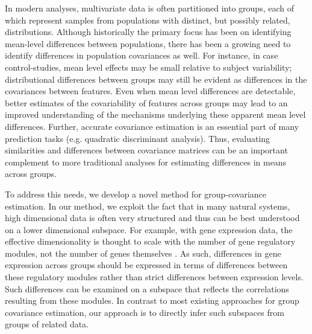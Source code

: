 \documentclass[12pt]{article}
\begin{document}
In modern analyses, multivariate data is often partitioned into
groups, each of which represent samples from populations with
distinct, but possibly related, distributions.  Although historically the
primary focus has been on identifying mean-level differences between
populations, there has been a growing need to identify differences in
population covariances as well.  For instance, in case
control-studies, mean level effects may be small relative to subject
variability; distributional differences between groups may still be
evident as differences in the covariances between features.  Even when
mean level differences are detectable, better estimates of the
covariability of features across groups may lead to an improved
understanding of the mechanisms underlying these apparent mean level
differences.  Further, accurate covariance estimation is an essential
part of many prediction tasks (e.g. quadratic discriminant analysis).
Thus, evaluating similarities and differences between covariance
matrices can be an important complement to more traditional analyses
for estimating differences in means across
groups.

To address this needs, we develop a novel method for
group-covariance estimation.  In our method, we exploit the fact that
in many natural systems, high dimensional data is often very
structured and thus can be best understood on a lower dimensional
subspace. For example, with gene expression data, the effective
dimensionality is thought to scale with the number of gene regulatory
modules, not the number of genes themselves \citep{Heimberg2016}.  As
such, differences in gene expression across groups should be expressed
in terms of differences between these regulatory modules rather than
strict differences between expression levels.  Such differences can be
examined on a subspace that reflects the correlations resulting from
these modules.  In contrast to most existing approaches for group
covariance estimation, our approach is to directly infer such
subspaces from groups of related data.

\end{document}
